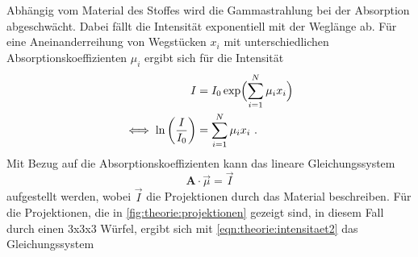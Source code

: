     Abhängig vom Material des Stoffes wird die Gammastrahlung bei der Absorption abgeschwächt.
    Dabei fällt die Intensität exponentiell mit der Weglänge ab.
    Für eine Aneinanderreihung von Wegstücken $x_i$
    mit unterschiedlichen Absorptionskoeffizienten $\mu_i$
    ergibt sich für die Intensität
    \begin{align}
        I &= I_0 \exp\Bigl(\sum_{i=1}^N \mu_i x_i \Bigr) \\
        \iff \ln\left(\frac{I}{I_0}\right) &= \sum_{i=1}^N \mu_i x_i \ .
        \label{eqn:theorie:intensitaet2}
    \end{align}
    Mit Bezug auf die Absorptionskoeffizienten kann das lineare Gleichungssystem
    \begin{equation}
        \symbf{A} \cdot \vec{\mu} = \vec{I}
    \end{equation}
    aufgestellt werden,
    wobei $\vec{I}$ die Projektionen durch das Material beschreiben.
    Für die Projektionen,
    die in \autoref{fig:theorie:projektionen} gezeigt sind,
    in diesem Fall durch einen 3x3x3 Würfel,
    ergibt sich mit \autoref{eqn:theorie:intensitaet2} das Gleichungssystem
